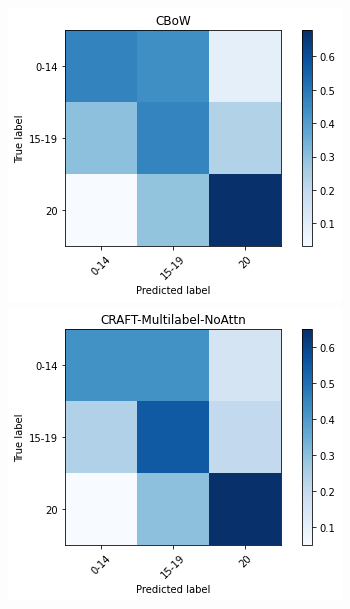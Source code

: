 \documentclass{article}
\newcommand{\fixme}[1]{\textcolor{red}{[FIXME: #1]}}
\begin{document}



\begin{figure}[]
  \centering
  \includegraphics[width=0.9\columnwidth]{figs/cm-bow.png}
  \includegraphics[width=0.9\columnwidth]{figs/cm-craftmultinoattn.png}

\end{figure}
\end{document}
